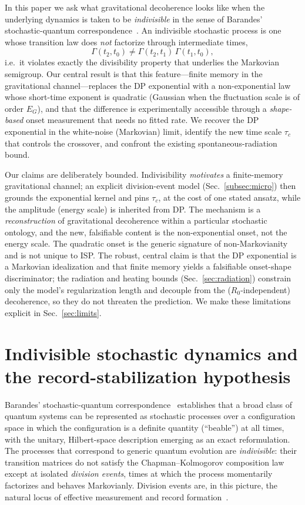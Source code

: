 \documentclass[aps,prd,onecolumn,amsmath,amssymb,nofootinbib,superscriptaddress]{revtex4-2}
\begin{document}
In this paper we ask what gravitational decoherence looks like when the underlying dynamics is
taken to be \emph{indivisible} in the sense of Barandes' stochastic-quantum
correspondence~\cite{R11,R12}. An indivisible stochastic process is one whose transition law does
\emph{not} factorize through intermediate times,
\begin{equation}
\Gamma(t_2,t_0)\neq\Gamma(t_2,t_1)\,\Gamma(t_1,t_0),
\end{equation}
i.e.\ it violates exactly the divisibility property that underlies the Markovian semigroup. Our
central result is that this feature---finite memory in the gravitational channel---replaces the DP
exponential with a non-exponential law whose short-time exponent is quadratic (Gaussian when the
fluctuation scale is of order $E_G$), and that the difference is experimentally accessible through a
\emph{shape-based} onset measurement that needs no fitted rate. We recover the DP exponential in the
white-noise (Markovian) limit, identify the new time scale $\tau_c$ that controls the crossover, and
confront the existing spontaneous-radiation bound.

Our claims are deliberately bounded. Indivisibility \emph{motivates} a finite-memory gravitational
channel; an explicit division-event model (Sec.~\ref{subsec:micro}) then grounds the exponential
kernel and pins $\tau_c$, at the cost of one stated ansatz, while the amplitude (energy scale) is
inherited from DP. The mechanism is a \emph{reconstruction} of gravitational decoherence within a
particular stochastic ontology, and the new, falsifiable content is the non-exponential onset, not
the energy scale. The
quadratic onset is the generic signature of non-Markovianity and is not unique to ISP. The robust,
central claim is that the DP exponential is a Markovian idealization and that finite memory yields a
falsifiable onset-shape discriminator; the radiation and heating bounds (Sec.~\ref{sec:radiation})
constrain only the model's regularization length and decouple from the ($R_0$-independent) decoherence,
so they do not threaten the prediction. We make these
limitations explicit in Sec.~\ref{sec:limits}.

\section{Indivisible stochastic dynamics and the record-stabilization hypothesis}\label{sec:isp}

Barandes' stochastic-quantum correspondence~\cite{R11,R12} establishes that a broad class of quantum
systems can be represented as stochastic processes over a configuration space in which the
configuration is a definite quantity (``beable'') at all times, with the unitary, Hilbert-space
description emerging as an exact reformulation. The processes that correspond to generic quantum
evolution are \emph{indivisible}: their transition matrices do not satisfy the Chapman--Kolmogorov
composition law except at isolated \emph{division events}, times at which the process momentarily
factorizes and behaves Markovianly. Division events are, in this picture, the natural locus of
effective measurement and record formation~\cite{R11,R12}.
\end{document}

